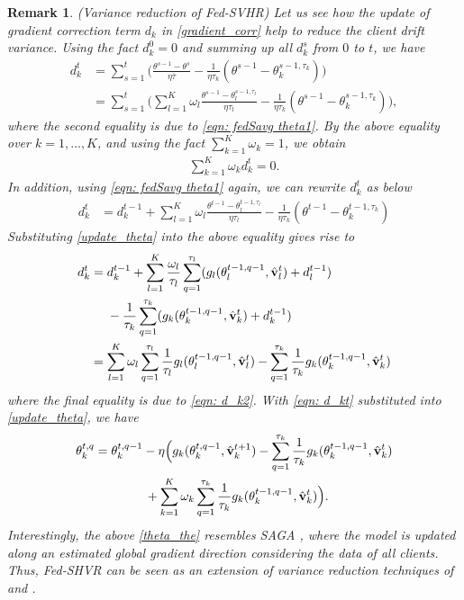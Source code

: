 \documentclass[twoside,journal]{IEEEtran}
\def\VectorFont{\bf}
\newcommand{\vv}{{\VectorFont v}}
\newtheorem{remark}{Remark}
\begin{document}
\begin{remark}\label{remark_2}{\rm (Variance reduction of Fed-SVHR)
Let us see how
the update of gradient correction term $d_k$ in \eqref{gradient_corr} help to reduce the client drift variance.
Using the fact $d_k^0=0$ and  summing up all $d_k^s$ from $0$ to $t$, we have
\begin{align*}
\nonumber d_k^t &= \sum_{s=1}^t\Big(\frac{\theta^{s-1}-\theta^s}{\eta \bar{\tau}}-\frac{1}{\eta \tau_k}(\theta^{s-1}-\theta_k^{s-1,\tau_k})\Big)\\
 &=\sum_{s=1}^t\Big(\sum_{l=1}^K\omega_l\frac{\theta^{s-1}-\theta_l^{s-1,\tau_l}}{\eta \tau_l}-\frac{1}{\eta \tau_k}(\theta^{s-1}-\theta_k^{s-1,\tau_k})\Big),
\end{align*}
where the second equality is due to \eqref{eqn: fedSavg theta1}. By  the above equality over $k=1,\ldots,K$, and using the fact $\sum_{k=1}^K\omega_k=1$, we obtain
\begin{align}\label{eqn: d_k2}
\sum_{k=1}^K\omega_kd_k^t =  0.
\end{align}
In addition, using \eqref{eqn: fedSavg theta1} again, we can rewrite $d_k^t$ as below
\begin{align}
\nonumber d_k^t &= d_k^{t-1}+\sum_{l=1}^K\omega_l\frac{\theta^{t-1}-\theta_l^{t-1,\tau_l}}{\eta \tau_l}-\frac{1}{\eta \tau_k}(\theta^{t-1}-\theta_k^{t-1,\tau_k})
\end{align}
Substituting  \eqref{update_theta} into the above equality gives rise to
\begin{align}\label{eqn: d_kt}
\nonumber d_k^t&=d_k^{t-1}+\sum_{l=1}^K\frac{\omega_l}{\tau_l}\sum_{q=1}^{\tau_l}
(g_l(\theta_l^{t-1,q-1}, \hat \vv_l^{t})+d_l^{t-1})\\
\nonumber&~~~~-\frac{1}{\tau_k}\sum_{q=1}^{\tau_k}
(g_k(\theta_k^{t-1,q-1}, \hat \vv_k^{t})+d_k^{t-1})\\
& = \sum_{l=1}^K\omega_l\sum_{q=1}^{\tau_l}\frac{1}{\tau_l}
g_l(\theta_l^{t-1,q-1}, \hat \vv_l^{t})-\sum_{q=1}^{\tau_k}\frac{1}{\tau_k}
g_k(\theta_k^{t-1,q-1}, \hat \vv_k^{t})
\end{align}
where  the final equality is due to \eqref{eqn: d_k2}. With \eqref{eqn: d_kt}  substituted into \eqref{update_theta}, we have
\begin{align}\label{theta_the}
\nonumber\theta_k^{t,q}&=\theta_k^{t,q-1}-\eta  \Big(g_k(\theta_k^{t,q-1}, \hat \vv_k^{t+1})-\sum_{q=1}^{\tau_k}\frac{1}{\tau_k}
g_k(\theta_k^{t-1,q-1}, \hat \vv_k^{t})\\
&\qquad\qquad+
\sum_{k=1}^K\omega_k\sum_{q=1}^{\tau_k}\frac{1}{\tau_k}
g_k(\theta_k^{t-1,q-1}, \hat \vv_k^{t})\Big).
\end{align}
Interestingly, the above \eqref{theta_the} resembles  SAGA \cite{defazio2014saga}, where the model is updated along an estimated global gradient direction considering the data of all clients. Thus,  Fed-SHVR can be seen as an extension of variance
reduction techniques of \cite{liang2019variance} and \cite{defazio2014saga}.}
\end{remark}
\end{document}
